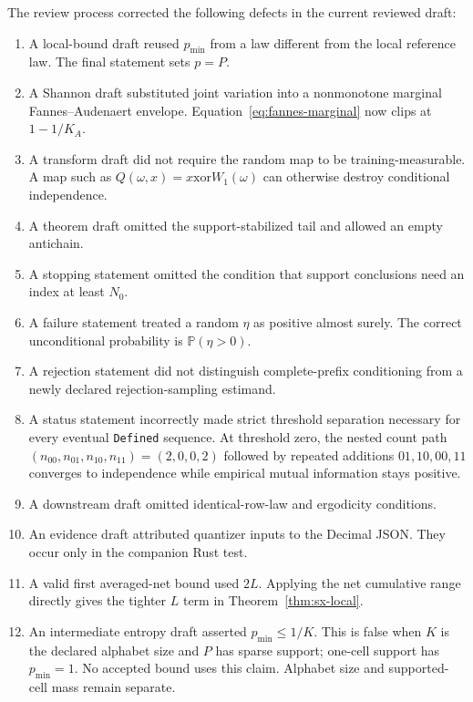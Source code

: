\documentclass[11pt]{article}
\theoremstyle{definition}
\newcommand{\Prb}{\mathbb{P}}
\begin{document}
The review process corrected the following defects in the current reviewed draft:
\begin{enumerate}
  \item A local-bound draft reused $p_{\min}$ from a law different from the local reference law.
    The final statement sets $p=P$.
  \item A Shannon draft substituted joint variation into a nonmonotone marginal
    Fannes--Audenaert envelope.  Equation~\eqref{eq:fannes-marginal} now clips at $1-1/K_A$.
  \item A transform draft did not require the random map to be training-measurable.  A map such as
    $Q(\omega,x)=x\mathbin{\mathrm{xor}}W_1(\omega)$ can otherwise destroy conditional
    independence.
  \item A theorem draft omitted the support-stabilized tail and allowed an empty antichain.
  \item A stopping statement omitted the condition that support conclusions need an index at
    least $N_0$.
  \item A failure statement treated a random $\eta$ as positive almost surely.  The correct
    unconditional probability is $\Prb(\eta>0)$.
  \item A rejection statement did not distinguish complete-prefix conditioning from a newly
    declared rejection-sampling estimand.
  \item A status statement incorrectly made strict threshold separation necessary for every
    eventual \texttt{Defined} sequence.  At threshold zero, the nested count path
    $(n_{00},n_{01},n_{10},n_{11})=(2,0,0,2)$ followed by repeated additions
    $01,10,00,11$ converges to independence while empirical mutual information stays positive.
  \item A downstream draft omitted identical-row-law and ergodicity conditions.
  \item An evidence draft attributed quantizer inputs to the Decimal JSON\@.  They occur only in the
    companion Rust test.
  \item A valid first averaged-net bound used $2L$.  Applying the net cumulative range directly
    gives the tighter $L$ term in Theorem~\ref{thm:sx-local}.
  \item An intermediate entropy draft asserted $p_{\min}\le 1/K$.  This is false when $K$ is the
    declared alphabet size and $P$ has sparse support; one-cell support has $p_{\min}=1$.  No
    accepted bound uses this claim.  Alphabet size and supported-cell mass remain separate.
\end{enumerate}
\end{document}
